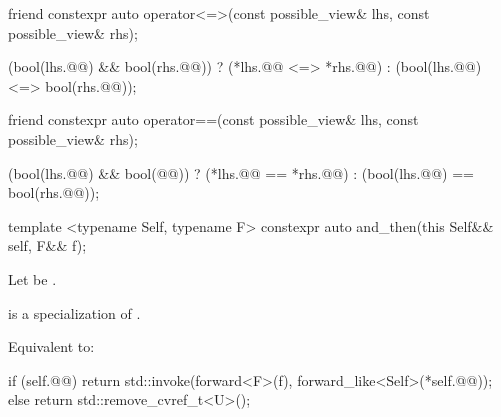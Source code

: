 \begin{itemdecl}
friend constexpr auto operator<=>(const possible_view& lhs,
                                  const possible_view& rhs);
\end{itemdecl}

\begin{itemdescr}
\pnum{}
\returns{}
\begin{codeblock}
(bool(lhs.@@) && bool(rhs.@@))
    ? (*lhs.@@ <=> *rhs.@@)
    : (bool(lhs.@@) <=> bool(rhs.@@));

\end{codeblock}

\end{itemdescr}

\begin{itemdecl}
friend constexpr auto operator==(const possible_view& lhs,
                                 const possible_view& rhs);
\end{itemdecl}

\begin{itemdescr}
\pnum{}
\returns
\begin{codeblock}
(bool(lhs.@@) && bool(@@))
    ? (*lhs.@@ == *rhs.@@)
    : (bool(lhs.@@) == bool(rhs.@@));
\end{codeblock}
\end{itemdescr}

\begin{itemdecl}
template <typename Self, typename F>
constexpr auto and_then(this Self&& self, F&& f);
\end{itemdecl}

\begin{itemdescr}
  \pnum
  Let  be .

  \pnum
  \mandates
   is a specialization of .

\pnum{}
\effects{}
Equivalent to:

\begin{codeblock}
  if (self.@@) {
    return std::invoke(forward<F>(f),
                       forward_like<Self>(*self.@@));
  } else {
    return std::remove_cvref_t<U>();
  }
\end{codeblock}
\end{itemdescr}

